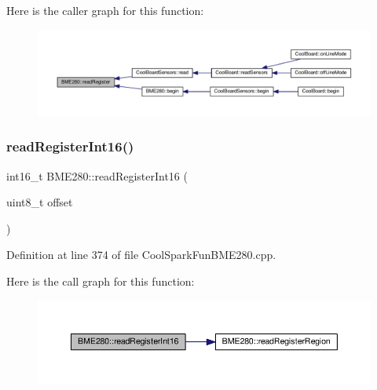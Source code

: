 Here is the caller graph for this function\+:
\nopagebreak
\begin{figure}[H]
\begin{center}
\leavevmode
\includegraphics[width=350pt]{class_b_m_e280_a1bbd14c8591966df531e40085342ff71_icgraph}
\end{center}
\end{figure}
\mbox{\label{class_b_m_e280_ac43c30f9b321d301694094d6b4bebe7e}} 
\subsubsection{\texorpdfstring{read\+Register\+Int16()}{readRegisterInt16()}}
{\footnotesize\ttfamily int16\+\_\+t B\+M\+E280\+::read\+Register\+Int16 (\begin{DoxyParamCaption}\item[{uint8\+\_\+t}]{offset }\end{DoxyParamCaption})}



Definition at line 374 of file Cool\+Spark\+Fun\+B\+M\+E280.\+cpp.

Here is the call graph for this function\+:
\nopagebreak
\begin{figure}[H]
\begin{center}
\leavevmode
\includegraphics[width=350pt]{class_b_m_e280_ac43c30f9b321d301694094d6b4bebe7e_cgraph}
\end{center}
\end{figure}
\mbox{\label{class_b_m_e280_aecca87c2c40a7f2bcabcea921bdc6124}} 
